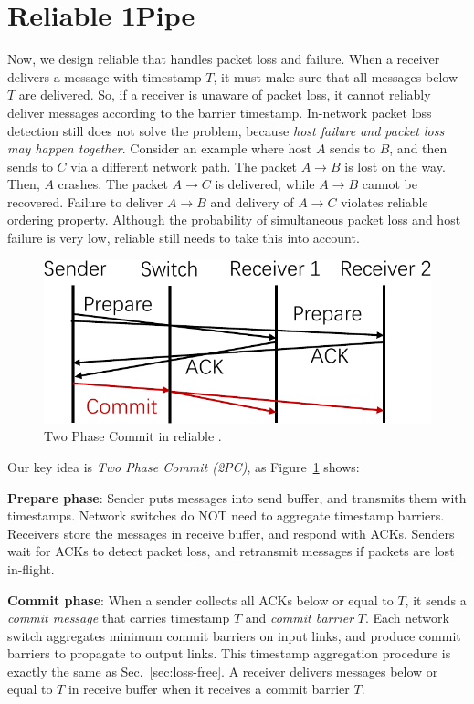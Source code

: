 \section{Reliable 1Pipe}
\label{sec:reliable}

Now, we design reliable \sys{} that handles packet loss and failure.
When a receiver delivers a message with timestamp $T$, it must make sure that all messages below $T$ are delivered.
So, if a receiver is unaware of packet loss, it cannot reliably deliver messages according to the barrier timestamp.
In-network packet loss detection still does not solve the problem, because \emph{host failure and packet loss may happen together}.
Consider an example where host $A$ sends to $B$, and then sends to $C$ via a different network path. The packet $A \rightarrow B$ is lost on the way. Then, $A$ crashes. The packet $A \rightarrow C$ is delivered, while $A \rightarrow B$ cannot be recovered. Failure to deliver $A \rightarrow B$ and delivery of $A \rightarrow C$ violates reliable ordering property.
Although the probability of simultaneous packet loss and host failure is very low, reliable \sys{} still needs to take this into account.


\begin{figure}[t]
\centering
	\includegraphics[width=.3\textwidth]{images/2PC.pdf}
	\caption{Two Phase Commit in reliable \sys{}.}
	\label{fig:2PC}
\end{figure}

Our key idea is \emph{Two Phase Commit (2PC)}, as Figure~\ref{fig:2PC} shows:

\begin{ecompact}
\item \textbf{Prepare phase}: Sender puts messages into send buffer, and transmits them with timestamps. Network switches do NOT need to aggregate timestamp barriers. Receivers store the messages in receive buffer, and respond with ACKs. Senders wait for ACKs to detect packet loss, and retransmit messages if packets are lost in-flight.
\item \textbf{Commit phase}: When a sender collects all ACKs below or equal to $T$, it sends a \emph{commit message} that carries timestamp $T$ and \emph{commit barrier} $T$. Each network switch aggregates minimum commit barriers on input links, and produce commit barriers to propagate to output links. This timestamp aggregation procedure is exactly the same as Sec.~\ref{sec:loss-free}. A receiver delivers messages below or equal to $T$ in receive buffer when it receives a commit barrier $T$.
\end{ecompact}



